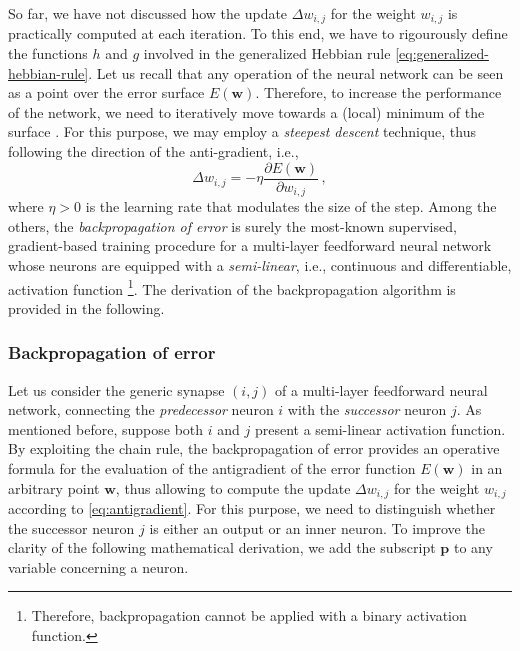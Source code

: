 \documentclass[12pt, a4paper, twoside, openright, notitlepage]{report}
\numberwithin{equation}{chapter}
\theoremstyle{theorem}
\theoremstyle{definition}
\theoremstyle{remark}
\theoremstyle{proposition}
\numberwithin{figure}{chapter}
\begin{document}
		\noindent So far, we have not discussed how the update $\Delta w_{i,j}$ for the weight $w_{i,j}$ is practically computed at each iteration. To this end, we have to rigourously define the functions $h$ and $g$ involved in the generalized Hebbian rule \eqref{eq:generalized-hebbian-rule}. Let us recall that any operation of the neural network can be seen as a point over the error surface $E(\mathbf{w})$. Therefore, to increase the performance of the network, we need to iteratively move towards a (local) minimum of the surface \cite{Hay05}. For this purpose, we may employ a \emph{steepest descent} technique, thus following the direction of the anti-gradient, i.e.,
		\begin{equation}
			\label{eq:antigradient}
			\Delta w_{i,j} = - \eta \dfrac{\partial E(\mathbf{w})}{\partial w_{i,j}} \, ,
		\end{equation}
		where $\eta > 0$ is the learning rate that modulates the size of the step. Among the others, the \emph{backpropagation of error} \cite{MR86} is surely the most-known supervised, gradient-based training procedure for a multi-layer feedforward neural network whose neurons are equipped with a \emph{semi-linear}, i.e., continuous and differentiable, activation function \footnote{Therefore, backpropagation cannot be applied with a binary activation function.}. The derivation of the backpropagation algorithm is provided in the following.
		
	\subsubsection{Backpropagation of error}
	\label{section:Backpropagation of error}
		
		Let us consider the generic synapse $(i,j)$ of a multi-layer feedforward neural network, connecting the \emph{predecessor} neuron $i$ with the \emph{successor} neuron $j$. As mentioned before, suppose both $i$ and $j$ present a semi-linear activation function. By exploiting the chain rule, the backpropagation of error provides an operative formula for the evaluation of the antigradient of the error function $E(\mathbf{w})$ in an arbitrary point $\mathbf{w}$, thus allowing to compute the update $\Delta w_{i,j}$ for the weight $w_{i,j}$ according to \eqref{eq:antigradient}. For this purpose, we need to distinguish whether the successor neuron $j$ is either an output or an inner neuron. To improve the clarity of the following mathematical derivation, we add the subscript $\mathbf{p}$ to any variable concerning a neuron.
		
\end{document}

